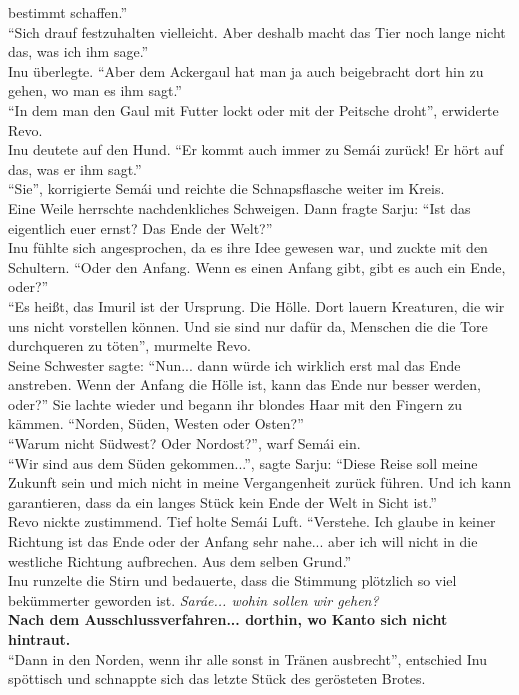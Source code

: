bestimmt schaffen.''\\
``Sich drauf festzuhalten vielleicht. Aber deshalb macht das Tier noch lange nicht das, was ich ihm 
sage.''\\
Inu überlegte. ``Aber dem Ackergaul hat man ja auch beigebracht dort hin zu gehen, wo man es ihm 
sagt.''\\
``In dem man den Gaul mit Futter lockt oder mit der Peitsche droht'', erwiderte Revo.\\
Inu deutete auf den Hund. ``Er kommt auch immer zu Semái zurück! Er hört auf das, was er ihm 
sagt.''\\
``Sie'', korrigierte Semái und reichte die Schnapsflasche weiter im Kreis.\\
Eine Weile herrschte nachdenkliches Schweigen. Dann fragte Sarju: ``Ist das eigentlich euer 
ernst? Das Ende der Welt?''\\
Inu fühlte sich angesprochen, da es ihre Idee gewesen war, und zuckte mit den Schultern. ``Oder den 
Anfang. Wenn es einen Anfang gibt, gibt es auch ein Ende, oder?''\\
``Es heißt, das Imuril ist der Ursprung. Die Hölle. Dort lauern Kreaturen, die wir uns nicht 
vorstellen können. Und sie sind nur dafür da, Menschen die die Tore durchqueren zu töten'', 
murmelte Revo.\\
Seine Schwester sagte: ``Nun... dann würde ich wirklich erst mal das Ende anstreben. Wenn der 
Anfang die Hölle ist, kann das Ende nur besser werden, oder?'' Sie lachte wieder und begann ihr 
blondes Haar mit den Fingern zu kämmen. ``Norden, Süden, Westen oder Osten?''\\
``Warum nicht Südwest? Oder Nordost?'', warf Semái ein.\\
``Wir sind aus dem Süden gekommen...'', sagte Sarju: ``Diese Reise soll meine Zukunft sein und mich 
nicht in meine Vergangenheit zurück führen. Und ich kann garantieren, dass da ein langes Stück kein 
Ende der Welt in Sicht ist.''\\
Revo nickte zustimmend. Tief holte Semái Luft. ``Verstehe. Ich glaube in keiner Richtung ist das 
Ende oder der Anfang sehr nahe... aber ich will nicht in die westliche Richtung aufbrechen. Aus dem 
selben Grund.''\\
Inu runzelte die Stirn und bedauerte, dass die Stimmung plötzlich so viel bekümmerter geworden ist. 
\textit{Saráe... wohin sollen wir gehen?}\\
\textbf{Nach dem Ausschlussverfahren... dorthin, wo Kanto sich nicht hintraut.}\\
``Dann in den Norden, wenn ihr alle sonst in Tränen ausbrecht'', entschied Inu spöttisch und 
schnappte sich das letzte Stück des gerösteten Brotes. \\





